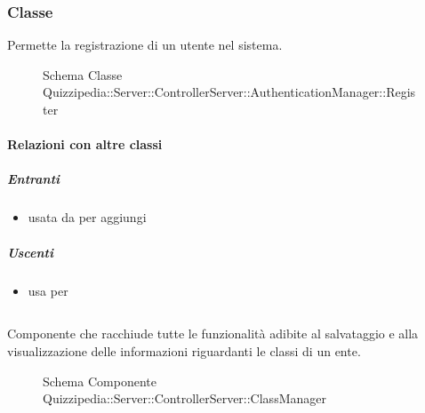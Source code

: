 \subsubsection{Classe }
Permette la registrazione di un utente nel sistema.
\begin{figure}[H]
\centering
\noindent{}
\caption[Schema Classe Register]{Schema Classe Quizzipedia::Server::ControllerServer::AuthenticationManager::Register}
\end{figure}
\paragraph{Relazioni con altre classi}
\subparagraph{Entranti}
\begin{itemize}
\item usata da  per aggiungi
\end{itemize}
\subparagraph{Uscenti}
\begin{itemize}
\item usa  per 
\end{itemize}
\subsection{}
Componente che racchiude tutte le funzionalità adibite al salvataggio e alla visualizzazione delle informazioni riguardanti le classi di un ente.
\begin{figure}[H]
\centering
\noindent{}
\caption[Schema Componente Quizzipedia::Server::ControllerServer::ClassManager]{Schema Componente Quizzipedia::Server::ControllerServer::ClassManager}
\end{figure}
